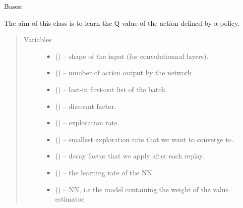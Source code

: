 \documentclass[letterpaper,10pt,english]{sphinxmanual}
\begin{document}
\begin{fulllineitems}
\label{\detokenize{package2:policyLearning.PolicyLearner}}
Bases: 

The aim of this class is to learn the Q-value of the action defined by a policy.
\begin{quote}\begin{description}
\item[{Variables}] \leavevmode\begin{itemize}
\item {} 
 () -- shape of the input (for convolutionnal layers).

\item {} 
 () -- number of action output by the network.

\item {} 
 () -- last-in first-out list of the batch.

\item {} 
 () -- discount factor.

\item {} 
 () -- exploration rate.

\item {} 
 () -- smallest exploration rate that we want to converge to.

\item {} 
 () -- decay factor that we apply after each replay.

\item {} 
 () -- the learning rate of the NN.

\item {} 
 () -- NN, i.e the model containing the weight of the value estimator.

\end{itemize}


\end{description}
\end{quote}
\end{fulllineitems}
\end{document}
